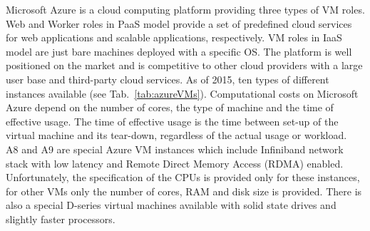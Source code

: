 \documentclass[3p,times]{elsarticle}
\begin{document}
Microsoft Azure is a cloud computing platform providing three types of VM roles. Web and Worker roles in PaaS model provide a set of predefined cloud services for web applications and scalable applications, respectively. VM roles in IaaS model are just bare machines deployed with a specific OS. The platform is well positioned on the market and is competitive to other cloud providers \cite{cloudScores} \cite{twister4azure} with a large user base and third-party cloud services. As of 2015, ten types of different instances available (see Tab.~\ref{tab:azureVMs}). Computational costs on Microsoft Azure depend on the number of cores, the type of machine and the time of effective usage. The time of effective usage is the time between set-up of the virtual machine and its tear-down, regardless of the actual usage or workload. \\
A8 and A9 are special Azure VM instances which include Infiniband network stack with low latency and Remote Direct Memory Access (RDMA) enabled. Unfortunately, the specification of the CPUs is provided only for these instances, for other VMs only the number of cores, RAM and disk size is provided. There is also a special D-series virtual machines available with solid state drives and slightly faster processors.
 
\end{document}
